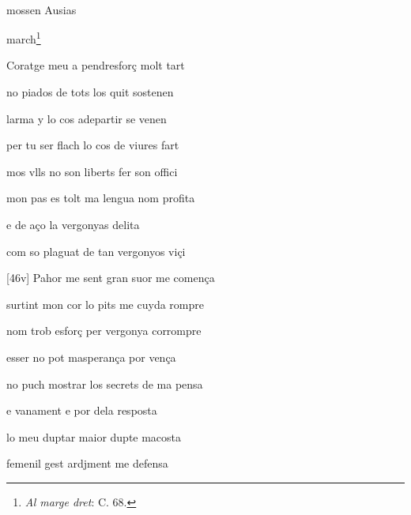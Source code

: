 \documentclass[12pt]{article}
\renewcommand{\espaiAbansEtiquetaPoema}{\vspace{0ex}}
\begin{document}
\begin{estrofa}

\espaiAbansEtiquetaPoema

\\

\begin{rubrica}

mossen Ausias

march\footnote{\textit{Al marge dret}: C. 68.}

\end{rubrica}

\end{estrofa}


\begin{estrofa}

 Coratge meu a pendresfor\c{c} molt tart

 no piados de tots los quit sostenen

 larma y lo cos adepartir se venen

 per tu ser flach lo cos de viures fart

 mos vlls no son liberts fer son offici

 mon pas es tolt ma lengua nom profita

 e de a\c{c}o la vergonyas delita

 com so plaguat de tan vergonyos vi\c{c}i

\end{estrofa}



\begin{estrofa}

 [46v] Pahor me sent gran suor me comen\c{c}a

 surtint mon cor lo pits me cuyda rompre

 nom trob esfor\c{c} per vergonya corrompre

 esser no pot masperan\c{c}a por ven\c{c}a

 no puch mostrar los secrets de ma pensa

 e vanament e por dela resposta

 lo meu duptar maior dupte macosta

 femenil gest ardjment me defensa

\end{estrofa}
\end{document}
